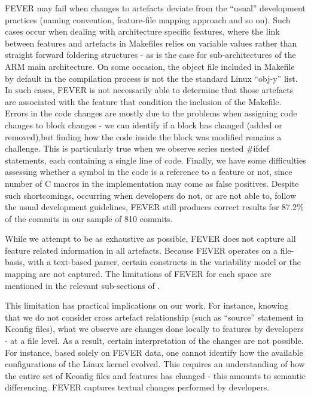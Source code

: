 FEVER may fail when changes to artefacts deviate from the ``usual'' development practices (naming convention, feature-file mapping approach and so on). 
Such cases occur when dealing with architecture specific features, where the link between features and artefacts in Makefiles relies on 
variable values rather than straight forward foldering structures - as is the case for sub-architectures of the ARM main architecture.
On some occasion, the object file included in Makefile by default in the compilation process is not the the standard Linux ``obj-y'' list. 
In such cases, FEVER is not necessarily able to determine that those artefacts are associated with the feature that condition the inclusion of the Makefile.
Errors in the code changes are mostly due to the problems when assigning code changes to block changes - we can identify if a block has changed (added or removed),but finding how the code inside the block was modified remains a challenge. 
This is particularly true when we observe series nested \#ifdef statements, each containing a single line of code.
Finally, we have some difficulties assessing whether a symbol in the code is a reference to a feature or not, since number of C macros in the implementation may come as false positives. Despite such shortcomings, occurring when developers do not, or are not able to, follow the usual development guidelines, FEVER still produces correct results for 87.2\% of the commits in our sample of 810 commits.

While we attempt to be as exhaustive as possible, FEVER does not capture all feature related information in all artefacts.
Because FEVER operates on a file-basis, with a text-based parser, certain constructs in the variability model or the mapping
are not captured. 
The limitations of FEVER for each space are mentioned in the relevant sub-sections of .

This limitation has practical implications on our work. For instance, knowing that we do not consider
cross artefact relationship (such as ``source'' statement in Kconfig files),
what we observe are changes done locally to features by developers - at a file level. 
As a result, certain interpretation of the changes are not possible. For instance, based solely on FEVER data, 
one cannot identify how the available configurations of the Linux kernel evolved. This requires an understanding of 
how the entire set of Kconfig files and features has changed - this amounts to semantic differencing. FEVER captures
textual changes performed by developers. 


